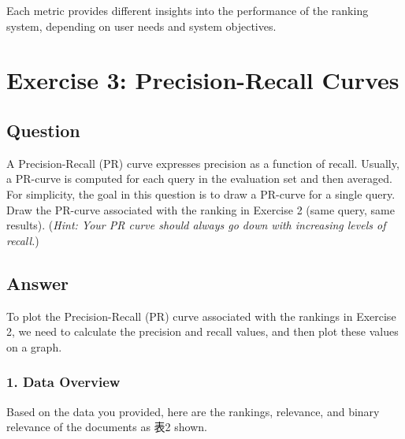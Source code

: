 \documentclass[a4paper, utf8]{ctexart}
\begin{document}
	Each metric provides different insights into the performance of the ranking system, depending on user needs and system objectives.
	
	\section{Exercise 3: Precision-Recall Curves}
	
	\subsection{Question}
	
	A Precision-Recall (PR) curve expresses precision as a function of recall. Usually, a PR-curve is computed for each query in the evaluation set and then averaged. For simplicity, the goal in this question is to draw a PR-curve for a single query. Draw the PR-curve associated with the ranking in Exercise 2 (same query, same results). (\textit{Hint: Your PR curve should always go down with increasing levels of recall.})
	
	\subsection{Answer}
	
	To plot the Precision-Recall (PR) curve associated with the rankings in Exercise 2, we need to calculate the precision and recall values, and then plot these values on a graph.
	
	\subsubsection*{1. Data Overview}  
	
	Based on the data you provided, here are the rankings, relevance, and binary relevance of the documents as 表2 shown.
	
\end{document}
